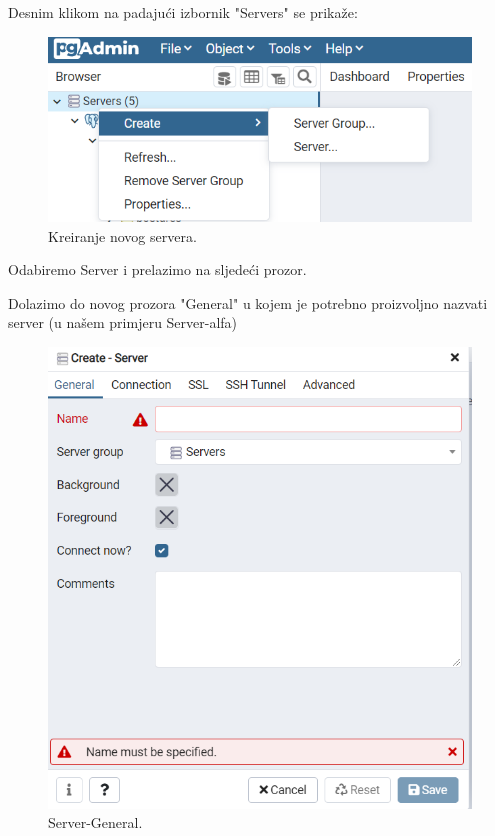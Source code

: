 			 Desnim klikom na padajući izbornik "Servers" se prikaže:
			 
			 \begin{figure}[H]
			 	\includegraphics[scale=1]{slike/novi server.png} 
			 	\centering
			 	\caption{ Kreiranje novog servera.}
			 	\label{NS}
			 \end{figure}
		 	
		 	 Odabiremo Server i prelazimo na sljedeći prozor.
			 
			 Dolazimo do novog prozora "General" u kojem je potrebno proizvoljno nazvati server (u našem primjeru Server-alfa)
			 \begin{figure}[H]
			 	\includegraphics[scale=1]{slike/server general.png} 
			 	\centering
			 	\caption{ Server-General.}
			 	\label{SG}
			 \end{figure}
			 
